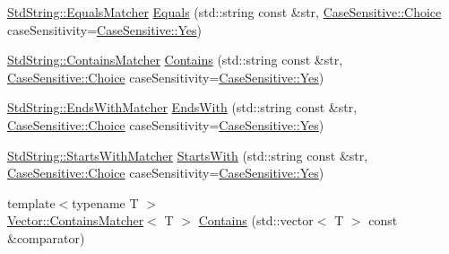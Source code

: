 \begin{DoxyCompactItemize}
\item 
\mbox{\hyperlink{struct_catch_1_1_matchers_1_1_std_string_1_1_equals_matcher}{Std\+String\+::\+Equals\+Matcher}} \mbox{\hyperlink{namespace_catch_1_1_matchers_af8af7dfc338335ed4c788cb1b37fc59f}{Equals}} (std\+::string const \&str, \mbox{\hyperlink{struct_catch_1_1_case_sensitive_aad49d3aee2d97066642fffa919685c6a}{Case\+Sensitive\+::\+Choice}} case\+Sensitivity=\mbox{\hyperlink{struct_catch_1_1_case_sensitive_aad49d3aee2d97066642fffa919685c6aa7c5550b69ec3c502e6f609b67f9613c6}{Case\+Sensitive\+::\+Yes}})
\item 
\mbox{\hyperlink{struct_catch_1_1_matchers_1_1_std_string_1_1_contains_matcher}{Std\+String\+::\+Contains\+Matcher}} \mbox{\hyperlink{namespace_catch_1_1_matchers_a1f6c2accdc6cd75a84d7112dcad647b4}{Contains}} (std\+::string const \&str, \mbox{\hyperlink{struct_catch_1_1_case_sensitive_aad49d3aee2d97066642fffa919685c6a}{Case\+Sensitive\+::\+Choice}} case\+Sensitivity=\mbox{\hyperlink{struct_catch_1_1_case_sensitive_aad49d3aee2d97066642fffa919685c6aa7c5550b69ec3c502e6f609b67f9613c6}{Case\+Sensitive\+::\+Yes}})
\item 
\mbox{\hyperlink{struct_catch_1_1_matchers_1_1_std_string_1_1_ends_with_matcher}{Std\+String\+::\+Ends\+With\+Matcher}} \mbox{\hyperlink{namespace_catch_1_1_matchers_ae5a45efb4538c57c43e04f3f9043ad6e}{Ends\+With}} (std\+::string const \&str, \mbox{\hyperlink{struct_catch_1_1_case_sensitive_aad49d3aee2d97066642fffa919685c6a}{Case\+Sensitive\+::\+Choice}} case\+Sensitivity=\mbox{\hyperlink{struct_catch_1_1_case_sensitive_aad49d3aee2d97066642fffa919685c6aa7c5550b69ec3c502e6f609b67f9613c6}{Case\+Sensitive\+::\+Yes}})
\item 
\mbox{\hyperlink{struct_catch_1_1_matchers_1_1_std_string_1_1_starts_with_matcher}{Std\+String\+::\+Starts\+With\+Matcher}} \mbox{\hyperlink{namespace_catch_1_1_matchers_a97c9ee09a70378ca7e8c6f9f01b0d6d1}{Starts\+With}} (std\+::string const \&str, \mbox{\hyperlink{struct_catch_1_1_case_sensitive_aad49d3aee2d97066642fffa919685c6a}{Case\+Sensitive\+::\+Choice}} case\+Sensitivity=\mbox{\hyperlink{struct_catch_1_1_case_sensitive_aad49d3aee2d97066642fffa919685c6aa7c5550b69ec3c502e6f609b67f9613c6}{Case\+Sensitive\+::\+Yes}})
\item 
{\footnotesize template$<$typename T $>$ }\\\mbox{\hyperlink{struct_catch_1_1_matchers_1_1_vector_1_1_contains_matcher}{Vector\+::\+Contains\+Matcher}}$<$ T $>$ \mbox{\hyperlink{namespace_catch_1_1_matchers_a4b3621740dc515216ad31ab827d4092c}{Contains}} (std\+::vector$<$ T $>$ const \&comparator)

\end{DoxyCompactItemize}
